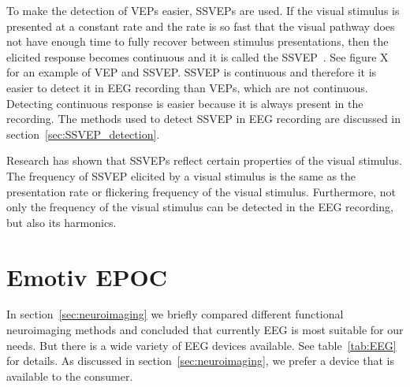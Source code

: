 To make the detection of \glspl{VEP} easier, \glspl{SSVEP} are used. If the visual stimulus is presented at a constant rate and the rate is so fast that the visual pathway does not have enough time to fully recover between stimulus presentations, then the elicited response becomes continuous and it is called the \gls{SSVEP}~\cite{VEP}. See figure X for an example of \gls{VEP} and \gls{SSVEP}. \gls{SSVEP} is continuous and therefore it is easier to detect it in \gls{EEG} recording than \glspl{VEP}, which are not continuous. Detecting continuous response is easier because it is always present in the recording. The methods used to detect \gls{SSVEP} in \gls{EEG} recording are discussed in section~\ref{sec:SSVEP_detection}.

Research has shown that \glspl{SSVEP} reflect certain properties of the visual stimulus. The frequency of \gls{SSVEP} elicited by a visual stimulus is the same as the presentation rate or \gls{flickering} frequency of the visual stimulus. Furthermore, not only the frequency of the visual stimulus can be detected in the \gls{EEG} recording, but also its \glspl{harmonic}. 

\section{Emotiv EPOC}
\label{sec:EEG_comparison}

In section~\ref{sec:neuroimaging} we briefly compared different functional neuroimaging methods and concluded that currently \gls{EEG} is most suitable for our needs. But there is a wide variety of EEG devices available. See table~\ref{tab:EEG} for details. As discussed in section~\ref{sec:neuroimaging}, we prefer a device that is available to the consumer.

\newcommand{\patiCHamp}{\tablefootnote{http://www.brainvision.com/files/actiCHamp-PyCorder-Flyer\_US.pdf}}
\newcommand{\pmitsar}{\tablefootnote{http://www.novatecheeg.com/products--software.html}}
\newcommand{\pemotiv}{\tablefootnote{https://emotiv.com/epoc.php}}
\newcommand{\pmindwave}{\tablefootnote{http://store.neurosky.com/products/mindwave-1}}
\newcommand{\mitsarspec}{\tablefootnote{http://www.mitsar-medical.com/eeg-machine/eeg-amplifier-compare/}}
\newcommand{\popenbci}{\tablefootnote{http://openbci.myshopify.com/products/openbci-8-bit-board-kit}}

